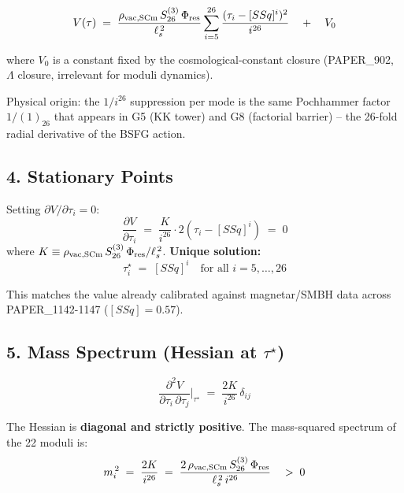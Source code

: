 \documentclass[
]{article}
\begin{document}
\[V(\tau) \;=\; \frac{\rho_{\rm vac,SCm}\,S_{26}^{(3)}\,\Phi_{\rm res}}{\ell_s^{\,2}}\sum_{i=5}^{26}\frac{(\tau_i - [SSq]^i)^{2}}{i^{26}} \quad +\quad V_0\]

where \(V_0\) is a constant fixed by the cosmological-constant closure
(PAPER\_902, \(\Lambda\) closure, irrelevant for moduli dynamics).

Physical origin: the \(1/i^{26}\) suppression per mode is the same
Pochhammer factor \(1/(1)_{26}\) that appears in G5 (KK tower) and G8
(factorial barrier) -- the 26-fold radial derivative of the BSFG action.

\subsection{4. Stationary Points}\label{stationary-points}

Setting \(\partial V/\partial \tau_i = 0\):
\[\frac{\partial V}{\partial \tau_i} \;=\; \frac{K}{i^{26}}\cdot 2(\tau_i - [SSq]^i) \;=\; 0\]
where
\(K \equiv \rho_{\rm vac,SCm}\,S_{26}^{(3)}\,\Phi_{\rm res}/\ell_s^{\,2}\).
\textbf{Unique solution:}
\[\boxed{\;\tau_i^\star \;=\; [SSq]^i \quad \text{for all } i = 5,\dots,26\;}\]

This matches the value already calibrated against magnetar/SMBH data
across PAPER\_1142-1147 (\([SSq] = 0.57\)).

\subsection{\texorpdfstring{5. Mass Spectrum (Hessian at
\(\tau^\star\))}{5. Mass Spectrum (Hessian at \textbackslash tau\^{}\textbackslash star)}}\label{mass-spectrum-hessian-at-taustar}

\[\frac{\partial^2 V}{\partial \tau_i\,\partial \tau_j}\bigg|_{\tau^\star} \;=\; \frac{2K}{i^{26}}\,\delta_{ij}\]

The Hessian is \textbf{diagonal and strictly positive}. The mass-squared
spectrum of the 22 moduli is:
\[m_i^{\,2} \;=\; \frac{2K}{i^{26}} \;=\; \frac{2\,\rho_{\rm vac,SCm}\,S_{26}^{(3)}\,\Phi_{\rm res}}{\ell_s^{\,2}\,i^{26}} \quad>\;0\]
\end{document}
